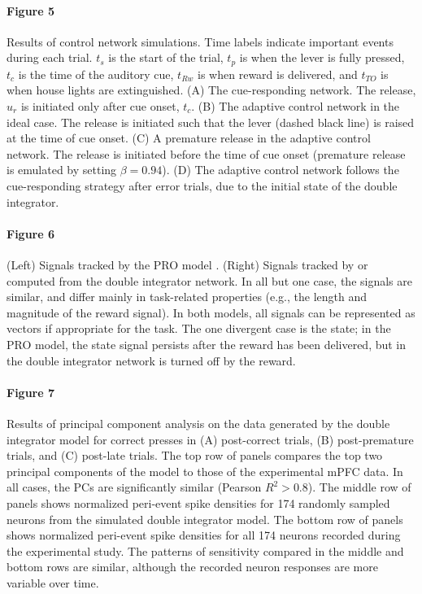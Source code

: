 \documentclass[11pt]{article}
\begin{document}
\paragraph{Figure 5}

Results of control network simulations.
Time labels indicate important events during each trial.
$t_s$ is the start of the trial,
$t_p$ is when the lever is fully pressed,
$t_c$ is the time of the auditory cue,
$t_{Rw}$ is when reward is delivered,
and $t_{TO}$ is when house lights are extinguished.
(A) The cue-responding network.
The release, $u_r$ is initiated only after cue onset, $t_c$.
(B) The adaptive control network in the ideal case.
The release is initiated such that
the lever (dashed black line) is raised
at the time of cue onset.
(C) A premature release in the adaptive control network.
The release is initiated before the time of cue onset
(premature release is emulated by setting $\beta = 0.94$).
(D) The adaptive control network follows
the cue-responding strategy after error trials,
due to the initial state of the double integrator.

\paragraph{Figure 6}


(Left) Signals tracked by the PRO model \cite{Alexander2011}.
(Right) Signals tracked by or computed from
the double integrator network.
In all but one case, the signals are similar,
and differ mainly in task-related properties
(e.g., the length and magnitude of the reward signal).
In both models, all signals can be represented
as vectors if appropriate for the task.
The one divergent case is the state;
in the PRO model, the state signal
persists after the reward has been delivered,
but in the double integrator network
is turned off by the reward.

\paragraph{Figure 7}

Results of principal component analysis
on the data generated by the double integrator model
for correct presses in (A) post-correct trials,
(B) post-premature trials, and (C) post-late trials.
The top row of panels compares
the top two principal components
of the model to those of the experimental mPFC data.
In all cases, the PCs are significantly similar
(Pearson $R^2 > 0.8$).
The middle row of panels shows normalized
peri-event spike densities
for 174 randomly sampled neurons from the
simulated double integrator model.
The bottom row of panels shows normalized
peri-event spike densities
for all 174 neurons recorded
during the experimental study.
The patterns of sensitivity
compared in the middle and bottom rows
are similar, although the recorded neuron responses
are more variable over time.
\end{document}
